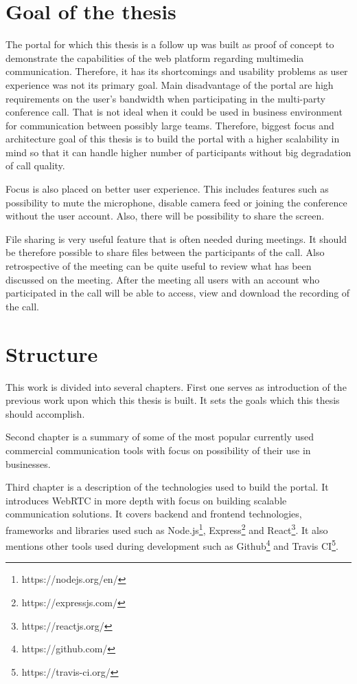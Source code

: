 \documentclass[
  digital, %
  table,   %
  lof,     %
  nolot,     %
]{fithesis3}
\begin{document}
\section{Goal of the thesis}
The portal for which this thesis is a follow up was built as proof of concept to demonstrate the capabilities of the web platform regarding multimedia communication. Therefore, it has its shortcomings and usability problems as user experience was not its primary goal. Main disadvantage of the portal are high requirements on the user's bandwidth when participating in the multi-party conference call. That is not ideal when it could be used in business environment for communication between possibly large teams. Therefore, biggest focus and architecture goal of this thesis is to build the portal with a higher scalability in mind so that it can handle higher number of participants without big degradation of call quality.

Focus is also placed on better user experience. This includes features such as possibility to mute the microphone, disable camera feed or joining  the conference without the user account. Also, there will be possibility to share the screen.
 
File sharing is very useful feature that is often needed during meetings. It should be therefore possible to share files between the participants of the call. Also retrospective of the meeting can be quite useful to review what has been discussed on the meeting. After the meeting all users with an account who participated in the call will be able to access, view and download the recording of the call.

\section{Structure}
This work is divided into several chapters. First one serves as introduction of the previous work upon which this thesis is built. It sets the goals which this thesis should accomplish.

Second chapter is a summary of some of the most popular currently used commercial communication tools with focus on possibility of their use in businesses.

Third chapter is a description of the technologies used to build the portal. It introduces WebRTC in more depth with focus on building scalable communication solutions. It covers backend and frontend technologies, frameworks and libraries used such as Node.js\footnote{https://nodejs.org/en/}, Express\footnote{https://expressjs.com/} and React\footnote{https://reactjs.org/}. It also mentions other tools used during development such as Github\footnote{https://github.com/} and Travis CI\footnote{https://travis-ci.org/}.
\end{document}
